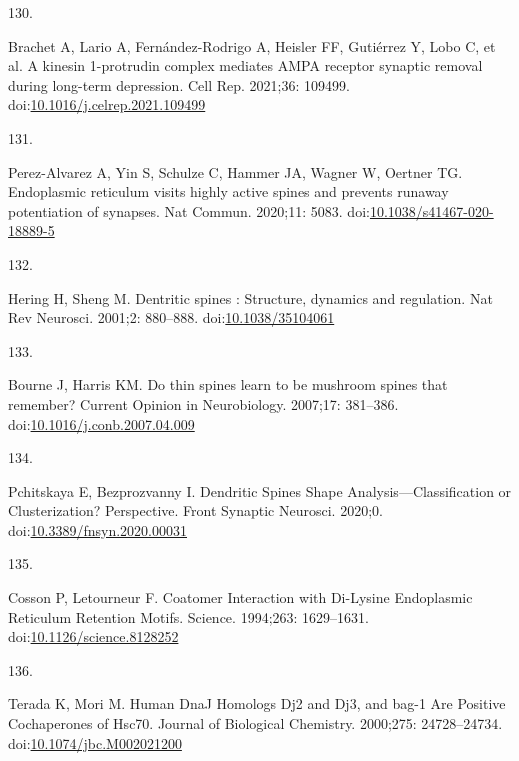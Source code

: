 \documentclass[
  12pt,
  a4paper,
]{book}
\newlength{\cslhangindent}
\newlength{\csllabelwidth}
\newlength{\cslentryspacingunit} %
\newenvironment{CSLReferences}[2] %
 {%
  \setlength{\parindent}{0pt}
  \ifodd #1
  \let\oldpar\par
  \def\par{\hangindent=\cslhangindent\oldpar}
  \fi
  \setlength{\parskip}{#2\cslentryspacingunit}
 }%
 {}
\newcommand{\CSLLeftMargin}[1]{\parbox[t]{\csllabelwidth}{#1}}
\newcommand{\CSLRightInline}[1]{\parbox[t]{\linewidth - \csllabelwidth}{#1}\break}
\begin{document}
\begin{CSLReferences}{0}{0}
\leavevmode{}%
\CSLLeftMargin{130. }%
\CSLRightInline{Brachet A, Lario A, Fernández-Rodrigo A, Heisler FF, Gutiérrez Y, Lobo C, et al. A kinesin 1-protrudin complex mediates {AMPA} receptor synaptic removal during long-term depression. Cell Rep. 2021;36: 109499. doi:\href{https://doi.org/10.1016/j.celrep.2021.109499}{10.1016/j.celrep.2021.109499}}

\leavevmode{}%
\CSLLeftMargin{131. }%
\CSLRightInline{Perez-Alvarez A, Yin S, Schulze C, Hammer JA, Wagner W, Oertner TG. Endoplasmic reticulum visits highly active spines and prevents runaway potentiation of synapses. Nat Commun. 2020;11: 5083. doi:\href{https://doi.org/10.1038/s41467-020-18889-5}{10.1038/s41467-020-18889-5}}

\leavevmode{}%
\CSLLeftMargin{132. }%
\CSLRightInline{Hering H, Sheng M. Dentritic spines : Structure, dynamics and regulation. Nat Rev Neurosci. 2001;2: 880--888. doi:\href{https://doi.org/10.1038/35104061}{10.1038/35104061}}

\leavevmode{}%
\CSLLeftMargin{133. }%
\CSLRightInline{Bourne J, Harris KM. Do thin spines learn to be mushroom spines that remember? Current Opinion in Neurobiology. 2007;17: 381--386. doi:\href{https://doi.org/10.1016/j.conb.2007.04.009}{10.1016/j.conb.2007.04.009}}

\leavevmode{}%
\CSLLeftMargin{134. }%
\CSLRightInline{Pchitskaya E, Bezprozvanny I. Dendritic {Spines Shape Analysis}---{Classification} or {Clusterization}? {Perspective}. Front Synaptic Neurosci. 2020;0. doi:\href{https://doi.org/10.3389/fnsyn.2020.00031}{10.3389/fnsyn.2020.00031}}

\leavevmode{}%
\CSLLeftMargin{135. }%
\CSLRightInline{Cosson P, Letourneur F. Coatomer {Interaction} with {Di-Lysine Endoplasmic Reticulum Retention Motifs}. Science. 1994;263: 1629--1631. doi:\href{https://doi.org/10.1126/science.8128252}{10.1126/science.8128252}}

\leavevmode{}%
\CSLLeftMargin{136. }%
\CSLRightInline{Terada K, Mori M. Human {DnaJ Homologs} Dj2 and Dj3, and bag-1 {Are Positive Cochaperones} of Hsc70. Journal of Biological Chemistry. 2000;275: 24728--24734. doi:\href{https://doi.org/10.1074/jbc.M002021200}{10.1074/jbc.M002021200}}


\end{CSLReferences}
\end{document}
